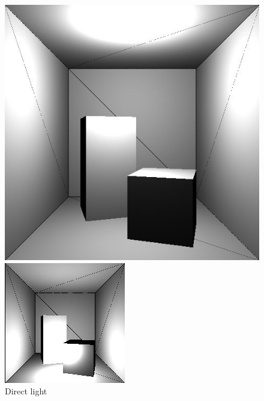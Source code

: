 \begin{figure}[H]
    \centering
    \includegraphics[width=\linewidth]{img/light1.jpg}
    \caption{Direct light}
\endminipage\hfill
{}
    \centering
    \includegraphics[width=\linewidth]{img/light2.jpg}

\end{figure}
